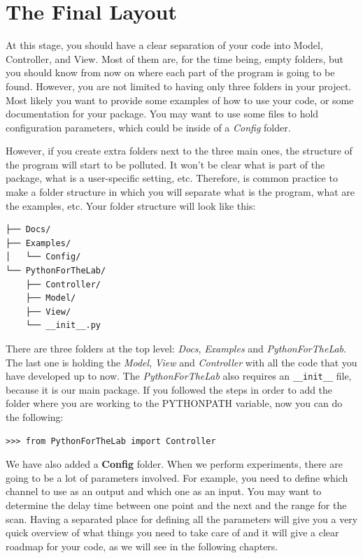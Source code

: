 
\section{The Final Layout}\label{the-finallayout}
At this stage, you should have a clear separation of your code into Model, Controller, and View. Most of them are, for the time being, empty folders, but you should know from now on where each part of the program is going to be found. However, you are not limited to having only three folders in your project. Most likely you want to provide some examples of how to use your code, or some documentation for your package. You may want to use some files to hold configuration parameters, which could be inside of a \emph{Config} folder.

However, if you create extra folders next to the three main ones, the structure of the program will start to be polluted. It won't be clear what is part of the package, what is a user-specific setting, etc. Therefore, is common practice to make a folder structure in which you will separate what is the program, what are the examples, etc. Your folder structure will look like this:

\begin{verbatim}
├── Docs/
├── Examples/
│   └── Config/
└── PythonForTheLab/
    ├── Controller/
    ├── Model/
    ├── View/
    └── __init__.py
\end{verbatim}

There are three folders at the top level: \emph{Docs}, \emph{Examples} and \emph{PythonForTheLab}. The last one is holding the \emph{Model}, \emph{View} and \emph{Controller} with all the code that you have developed up to now. The \emph{PythonForTheLab} also requires an \texttt{\_\_init\_\_} file, because it is our main package. If you followed the steps in order to add the folder where you are working to the PYTHONPATH variable, now you can do the following:

\begin{verbatim}
>>> from PythonForTheLab import Controller
\end{verbatim}

We have also added a \textbf{Config} folder. When we perform experiments, there are going to be a lot of parameters involved. For example, you need to define which channel to use as an output and which one as an input. You may want to determine the delay time between one point and the next and the range for the scan. Having a separated place for defining all the parameters will give you a very quick overview of what things you need to take care of and it will give a clear roadmap for your code, as we will see in the following chapters. 

